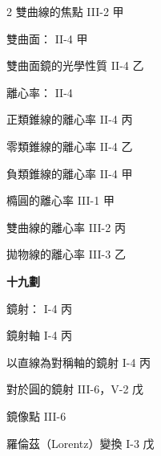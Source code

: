 \begin{multicols}{2}
\noindent\hspace*{1.5em} 雙曲線的焦點 \hfill III-2 甲\par
\noindent 雙曲面： \hfill II-4 甲\par
\noindent\hspace*{1.5em} 雙曲面鏡的光學性質 \hfill II-4 乙\par
\noindent 離心率： \hfill II-4\par
\noindent\hspace*{1.5em} 正類錐線的離心率 \hfill II-4 丙\par
\noindent\hspace*{1.5em} 零類錐線的離心率 \hfill II-4 乙\par
\noindent\hspace*{1.5em} 負類錐線的離心率 \hfill II-4 甲\par
\noindent\hspace*{1.5em} 橢圓的離心率 \hfill III-1 甲\par
\noindent\hspace*{1.5em} 雙曲線的離心率 \hfill III-2 丙\par
\noindent\hspace*{1.5em} 拋物線的離心率 \hfill III-3 乙\par

\vspace{0.8em}
\begin{center}
\textbf{\large 十九劃}
\end{center}

\noindent 鏡射： \hfill I-4 丙\par
\noindent\hspace*{1.5em} 鏡射軸 \hfill I-4 丙\par
\noindent\hspace*{1.5em} 以直線為對稱軸的鏡射 \hfill I-4 丙\par
\noindent\hspace*{1.5em} 對於圓的鏡射 \hfill III-6，V-2 戊\par
\noindent 鏡像點 \hfill III-6\par
\noindent 羅倫茲（Lorentz）變換 \hfill I-3 戊\par

\end{multicols}
